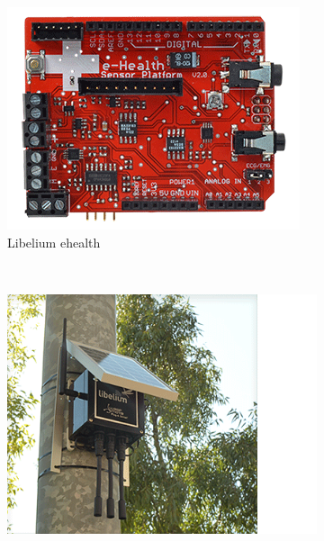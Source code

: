\documentclass[12pt, a4paper,twoside]{tesi_upf}
\begin{document}
      \begin{figure}
        \centering
        \begin{subfigure}[b]{0.3\textwidth}
                \includegraphics[width=\textwidth]{./Figures/Libeliume_health.png}
                \caption{Libelium ehealth}
                \label{fig:Libeliumehealth}
        \end{subfigure}%
        ~ %
        \begin{subfigure}[b]{0.3\textwidth}
                \includegraphics[width=\textwidth]{./Figures/LibeliumWaspmote.png}

\end{subfigure}
\end{figure}
\end{document}
